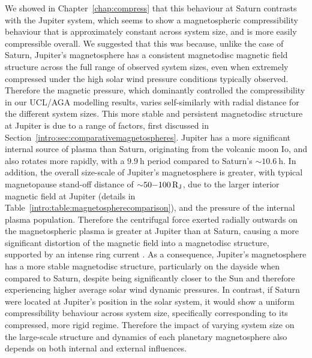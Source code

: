 We showed in Chapter~\ref{chap:compress} that this behaviour at Saturn contrasts with the Jupiter system, which seems to show a magnetospheric compressibility behaviour that is approximately constant across system size, and is more easily compressible overall. We suggested that this was because, unlike the case of Saturn, Jupiter's magnetosphere has a consistent magnetodisc magnetic field structure across the full range of observed system sizes, even when extremely compressed under the high solar wind pressure conditions typically observed. Therefore the magnetic pressure, which dominantly controlled the compressibility in our UCL/AGA modelling results, varies self-similarly with radial distance for the different system sizes. This more stable and persistent magnetodisc structure at Jupiter is due to a range of factors, first discussed in Section~\ref{intro:sec:comparativemagnetospheres}. Jupiter has a more significant internal source of plasma than Saturn, originating from the volcanic moon Io, and also rotates more rapidly, with a $\SI{9.9}{\hour}$ period compared to Saturn's ${\sim}\SI{10.6}{\hour}$. In addition, the overall size-scale of Jupiter's magnetosphere is greater, with typical magnetopause stand-off distance of ${\sim}50{\--}\SI{100}{R_J}$, due to the larger interior magnetic field at Jupiter (details in Table~\ref{intro:table:magnetospherecomparison}), and the pressure of the internal plasma population. Therefore the centrifugal force exerted radially outwards on the magnetospheric plasma is greater at Jupiter than at Saturn, causing a more significant distortion of the magnetic field into a magnetodisc structure, supported by an intense ring current \citep[e.g.][]{khurana2004}. As a consequence, Jupiter's magnetosphere has a more stable magnetodisc structure, particularly on the dayside when compared to Saturn, despite being significantly closer to the Sun and therefore experiencing higher average solar wind dynamic pressures. In contrast, if Saturn were located at Jupiter's position in the solar system, it would show a uniform compressibility behaviour across system size, specifically corresponding to its compressed, more rigid regime. Therefore the impact of varying system size on the large-scale structure and dynamics of each planetary magnetosphere also depends on both internal and external influences.

